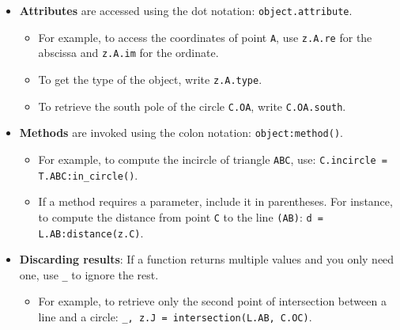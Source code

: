 \begin{itemize}
  \item \textbf{Attributes} are accessed using the dot notation: \verb|object.attribute|.
    \begin{itemize}
      \item For example, to access the coordinates of point \verb|A|, use \verb|z.A.re| for the abscissa and \verb|z.A.im| for the ordinate.
      \item To get the type of the object, write \verb|z.A.type|.
      \item To retrieve the south pole of the circle \verb|C.OA|, write \verb|C.OA.south|.
    \end{itemize}

  \item \textbf{Methods} are invoked using the colon notation: \verb|object:method()|.
    \begin{itemize}
      \item For example, to compute the incircle of triangle \verb|ABC|, use: \verb|C.incircle = T.ABC:in_circle()|.
      \item If a method requires a parameter, include it in parentheses. For instance, to compute the distance from point \verb|C| to the line \verb|(AB)|: \verb|d = L.AB:distance(z.C)|.
    \end{itemize}

  \item \textbf{Discarding results}: If a function returns multiple values and you only need one, use \verb|_| to ignore the rest.
    \begin{itemize}
      \item For example, to retrieve only the second point of intersection between a line and a circle: \verb|_, z.J = intersection(L.AB, C.OC)|.
    \end{itemize}
\end{itemize}



